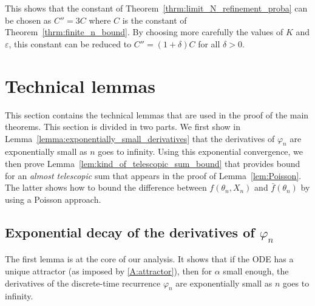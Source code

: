 \documentclass{article}
\begin{document}
This shows that the constant of Theorem~\ref{thrm:limit_N_refinement_proba} can be chosen as $C''=3C$ where $C$ is the constant of Theorem~\ref{thrm:finite_n_bound}. By choosing more carefully the values of $K$ and $\varepsilon$, this constant can be reduced to $C''=(1+\delta)C$ for all $\delta>0$.



\section{Technical lemmas}
\label{sec:proof_lemma}

This section contains the technical lemmas that are used in the proof of the main theorems. This section is divided in two parts. We first show in Lemma~\ref{lemma:exponentially_small_derivatives} that the derivatives of $\varphi_{n}$ are exponentially small as $n$ goes to infinity. Using this exponential convergence, we then prove Lemma~\ref{lem:kind_of_telescopic_sum_bound} that provides bound for an \emph{almost telescopic} sum that appears in the proof of Lemma~\ref{lem:Poisson}. The latter shows how to bound the difference between $f(\theta_n,X_n)$ and $\bar{f}(\theta_n)$ by using a Poisson approach.


\subsection{Exponential decay of the derivatives of \texorpdfstring{$\varphi_n$}{φn}}

The first lemma is at the core of our analysis. It shows that if the ODE has a unique attractor (as imposed by \ref{A:attractor}), then for $\alpha$ small enough, the derivatives of the discrete-time recurrence $\varphi_n$ are exponentially small as $n$ goes to infinity. 
\end{document}
